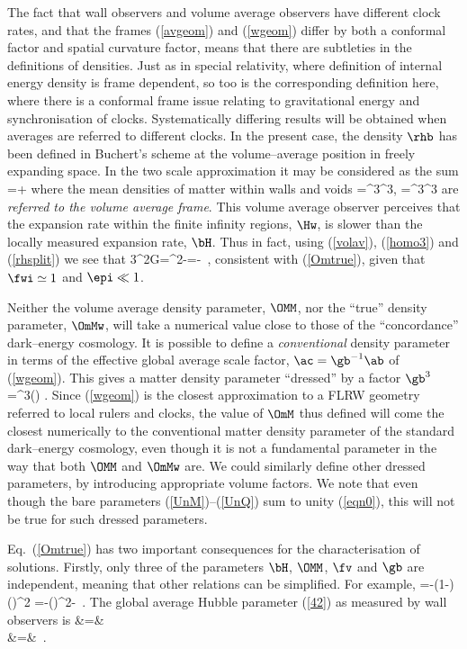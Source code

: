 \documentclass[12pt]{iopart}
\begin{document}
The fact that wall observers and volume average observers have different
clock rates, and that the frames (\ref{avgeom}) and (\ref{wgeom}) differ
by both a conformal factor and spatial curvature factor, means that there are
subtleties in the definitions of densities. Just as in special relativity,
where definition of internal energy density is frame dependent, so too is
the corresponding definition here, where there is a conformal frame issue
relating to gravitational energy and synchronisation of clocks. Systematically
differing results will be obtained when averages are referred to different
clocks. In the present case, the density $\rhb$ has been defined in
Buchert's scheme at the volume--average position in freely expanding space.
In the two scale approximation it may be considered as the sum
\beq
\rhb=\fvf\rhw+\fv\rhv
\eeq
where the mean densities of matter within walls and voids
\beq
\rhw={\rhb{}\ab{}^3\over\aw^3},\qquad
\rhv={\rhb{}\ab{}^3\over\av^3}
\label{rhsplit}\eeq
are {\em referred to the volume average frame}. This volume average observer
perceives that the expansion rate within the finite infinity regions, $\Hw$, is
slower than the locally measured expansion rate, $\bH$. Thus in fact, using
(\ref{volav}), (\ref{homo3}) and (\ref{rhsplit}) we see that
\beq
{3\Hw^2\rhw{}\pi G}={\fwi\gb^2\OMM{}-\fv}={\fwi\OmMw{}-\epi}
\simeq\OmMw\,,
\eeq
consistent with (\ref{Omtrue}), given that $\fwi\simeq1$ and $\epi\ll1$.

Neither the volume average density parameter, $\OMM$, nor the ``true'' density
parameter, $\OmMw$, will take a numerical value close to those of the
``concordance'' dark--energy cosmology. It is possible to define a
{\em conventional} density parameter in terms of the
effective global average scale factor, $\ac=\gb^{-1}\ab$ of (\ref{wgeom}).
This gives a matter density parameter ``dressed'' by a
factor $\gb^3$
\beq
\OmM=\gb^3(\tc)\,\OMM\,.
\label{Omrel}\eeq
Since (\ref{wgeom}) is the closest approximation to a FLRW geometry
referred to local rulers and clocks, the value of $\OmM$ thus defined
will come the closest numerically to the conventional matter density
parameter of the standard dark--energy cosmology, even
though it is not a fundamental parameter in the way that both $\OMM$ and
$\OmMw$ are. We could similarly define other dressed parameters, by
introducing appropriate volume factors. We note that
even though the bare parameters (\ref{UnM})--(\ref{UnQ}) sum
to unity (\ref{eqn0}), this will not be true for such dressed parameters.

Eq.\ (\ref{Omtrue}) has two important consequences for the characterisation
of solutions. Firstly, only three of the parameters $\bH$, $\OMM$, $\fv$ and
$\gb$ are independent, meaning that other relations can be simplified. For
example,
\beq \OMQ={-(1-\fv)()^2\over\fv\gb{}}
={-()^2\OMM{}-\gb{}\OMM} \,.
\label{Q3}\eeq
The global average Hubble parameter (\ref{42}) as measured by wall observers
is
\bea
\Hh&=&\gb\bH{}\nonumber\\
&=&\bH{}\,
.\label{hg}
\eea
\end{document}
